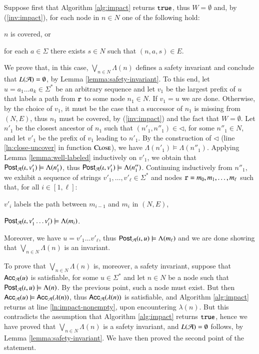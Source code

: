 \documentclass[10pt]{llncs}
\begin{document}
{  Suppose first that Algorithm \ref{alg:impact} returns $\mathtt{true}$, thus
  $W = \emptyset$ and, by (\ref{inv:impact}), for each node in $n \in
  N$ one of the following hold: \begin{compactitem}
  \item $n$ is covered, or
  \item for each $a \in \Sigma$ there exists $s \in N$ such that
    $(n,a,s) \in E$. 
  \end{compactitem}
  We prove that, in this case, $\bigvee_{n \in N} \Lambda(n)$ defines
  a safety invariant and conclude that $L(\mathcal{A}) = \emptyset$, by Lemma
  \ref{lemma:safety-invariant}. To this end, let $u = a_1 \ldots a_k
  \in \Sigma^*$ be an arbitrary sequence and let $v_1$ be the largest
  prefix of $u$ that labels a path from $\mathtt{r}$ to some node $n_1
  \in N$. If $v_1 = u$ we are done. Otherwise, by the choice of $v_1$,
  it must be the case that a successor of $n_1$ is missing from
  $(N,E)$, thus $n_1$ must be covered, by (\ref{inv:impact}) and the
  fact that $W=\emptyset$. Let $n'_1$ be the closest ancestor of $n_1$
  such that $(n'_1,n''_1) \in \lhd$, for some $n''_1 \in N$, and let
  $v'_1$ be the prefix of $v_1$ leading to $n'_1$. By the construction
  of $\lhd$ (line \ref{ln:close-uncover} in function
  $\Call{Close}{}$), we have $\Lambda(n'_1) \models
  \Lambda(n''_1)$. Applying Lemma \ref{lemma:well-labeled} inductively
  on $v'_1$, we obtain that $\mathsf{Post}_{\mathcal{A}}(\iota,v'_1) \models
  \Lambda(n'_1)$, thus $\mathsf{Post}_{\mathcal{A}}(\iota,v'_1) \models \Lambda(n''_1)$.
  Continuing inductively from $n''_1$, we exhibit a sequence of
  strings $v'_1,\ldots,v'_\ell \in \Sigma^*$ and nodes $\mathtt{r} =
  m_0,m_1,\ldots,m_\ell$ such that, for all $i \in
  [1,\ell]$: \begin{compactitem}
  \item $v'_i$ labels the path between $m_{i-1}$ and $m_i$ in $(N,E)$,    
  \item $\mathsf{Post}_{\mathcal{A}}(\iota,v'_1\ldots v'_i) \models \Lambda(m_i)$.
  \end{compactitem}
  Moreover, we have $u = v'_1 \ldots v'_\ell$, thus
  $\mathsf{Post}_{\mathcal{A}}(\iota,u) \models \Lambda(m_\ell)$ and we are done showing
  that $\bigvee_{n\in N} \Lambda(n)$ is an invariant. 

  To prove that $\bigvee_{n \in N} \Lambda(n)$ is, moreover, a safety
  invariant, suppose that $\mathsf{Acc}_{\mathcal{A}}(u)$ is satisfiable, for some $u
  \in \Sigma^*$ and let $n \in N$ be a node such that
  $\mathsf{Post}_{\mathcal{A}}(\iota,u) \models \Lambda(n)$. By the previous point, such
  a node must exist. But then $\mathsf{Acc}_{\mathcal{A}}(u) \models
  \mathsf{Acc}_{\mathcal{A}}(\lambda(n))$, thus $\mathsf{Acc}_{\mathcal{A}}(\lambda(n))$ is
  satisfiable, and Algorithm \ref{alg:impact} returns at line
  \ref{ln:impact-nonempty}, upon encountering $\lambda(n)$. But this
  contradicts the assumption that Algorithm \ref{alg:impact} returns
  $\mathtt{true}$, hence we have proved that $\bigvee_{n \in N} \Lambda(n)$ is
  a safety invariant, and $L(\mathcal{A}) = \emptyset$ follows, by Lemma
  \ref{lemma:safety-invariant}. We have then proved the second point
  of the statement.

}
\end{document}
